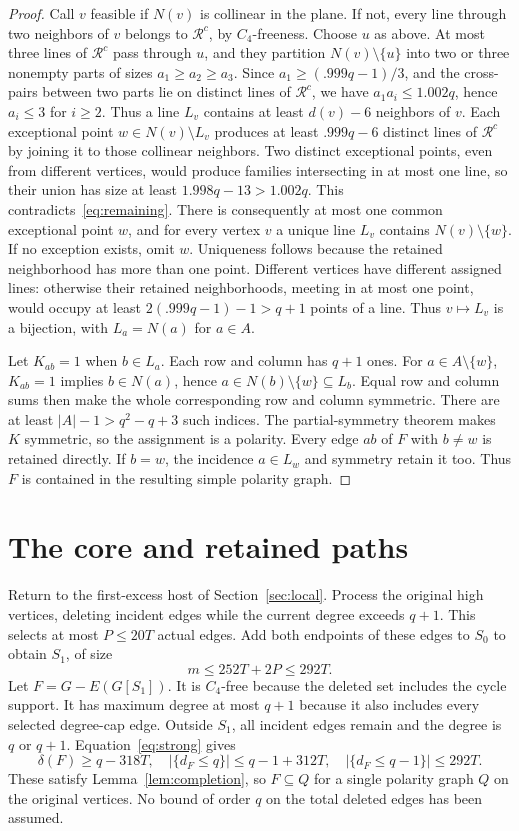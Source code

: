 \documentclass[11pt]{article}
\theoremstyle{remark}\newtheorem*{remark}{Remark}
\begin{document}
\begin{proof}
Call $v$ feasible if $N(v)$ is collinear in the plane. If not, every line through two neighbors of $v$ belongs to $\mathcal R^c$, by $C_4$-freeness. Choose $u$ as above. At most three lines of $\mathcal R^c$ pass through $u$, and they partition $N(v)\setminus\{u\}$ into two or three nonempty parts of sizes $a_1\geq a_2\geq a_3$. Since $a_1\geq(.999q-1)/3$, and the cross-pairs between two parts lie on distinct lines of $\mathcal R^c$, we have $a_1a_i\leq1.002q$, hence $a_i\leq3$ for $i\geq2$. Thus a line $L_v$ contains at least $d(v)-6$ neighbors of $v$.
Each exceptional point $w\in N(v)\setminus L_v$ produces at least $.999q-6$ distinct lines of $\mathcal R^c$ by joining it to those collinear neighbors. Two distinct exceptional points, even from different vertices, would produce families intersecting in at most one line, so their union has size at least $1.998q-13>1.002q$. This contradicts~\eqref{eq:remaining}.
There is consequently at most one common exceptional point $w$, and for every vertex $v$ a unique line $L_v$ contains $N(v)\setminus\{w\}$. If no exception exists, omit $w$. Uniqueness follows because the retained neighborhood has more than one point. Different vertices have different assigned lines: otherwise their retained neighborhoods, meeting in at most one point, would occupy at least $2(.999q-1)-1>q+1$ points of a line. Thus $v\mapsto L_v$ is a bijection, with $L_a=N(a)$ for $a\in A$.

Let $K_{ab}=1$ when $b\in L_a$. Each row and column has $q+1$ ones. For $a\in A\setminus\{w\}$, $K_{ab}=1$ implies $b\in N(a)$, hence $a\in N(b)\setminus\{w\}\subseteq L_b$. Equal row and column sums then make the whole corresponding row and column symmetric. There are at least $|A|-1>q^2-q+3$ such indices. The partial-symmetry theorem makes $K$ symmetric, so the assignment is a polarity. Every edge $ab$ of $F$ with $b\ne w$ is retained directly. If $b=w$, the incidence $a\in L_w$ and symmetry retain it too. Thus $F$ is contained in the resulting simple polarity graph.
\end{proof}

\section{The core and retained paths}\label{sec:core}
Return to the first-excess host of Section~\ref{sec:local}. Process the original high vertices, deleting incident edges while the current degree exceeds $q+1$. This selects at most $P\leq20T$ actual edges. Add both endpoints of these edges to $S_0$ to obtain $S_1$, of size
\[
 m\leq252T+2P\leq292T.
\]
Let $F=G-E(G[S_1])$. It is $C_4$-free because the deleted set includes the cycle support. It has maximum degree at most $q+1$ because it also includes every selected degree-cap edge. Outside $S_1$, all incident edges remain and the degree is $q$ or $q+1$. Equation~\eqref{eq:strong} gives
\[
 \delta(F)\geq q-318T,\quad
 |\{d_F\leq q\}|\leq q-1+312T,\quad
 |\{d_F\leq q-1\}|\leq292T.
\]
These satisfy Lemma~\ref{lem:completion}, so $F\subseteq Q$ for a single polarity graph $Q$ on the original vertices. No bound of order $q$ on the total deleted edges has been assumed.
\end{document}
